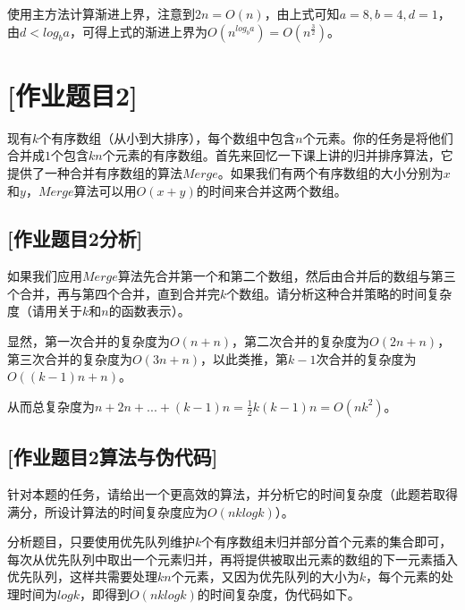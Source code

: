 \documentclass{article}
\begin{document}
使用主方法计算渐进上界，注意到$2n=O(n)$，由上式可知$a=8,b=4,d=1$，由$d<log_b a$，可得上式的渐进上界为$O(n^{log_b a})=O(n^\frac{3}{2})$。


\section{[作业题目2]} %


现有$k$个有序数组（从小到大排序），每个数组中包含$n$个元素。你的任务是将他们合并成$1$个包含$kn$个元素的有序数组。首先来回忆一下课上讲的归并排序算法，它提供了一种合并有序数组的算法$Merge$。如果我们有两个有序数组的大小分别为$x$和$y$，$Merge$算法可以用$O(x+y)$的时间来合并这两个数组。

\subsection{[作业题目2分析]} %

如果我们应用$Merge$算法先合并第一个和第二个数组，然后由合并后的数组与第三个合并，再与第四个合并，直到合并完$k$个数组。请分析这种合并策略的时间复杂度（请用关于$k$和$n$的函数表示）。

显然，第一次合并的复杂度为$O(n+n)$，第二次合并的复杂度为$O(2n+n)$，第三次合并的复杂度为$O(3n+n)$，以此类推，第$k-1$次合并的复杂度为$O((k-1)n+n)$。

从而总复杂度为$n+2n+...+(k-1)n=\frac{1}{2}k(k-1)n=O(nk^2)$。

\subsection{[作业题目2算法与伪代码]} %

针对本题的任务，请给出一个更高效的算法，并分析它的时间复杂度（此题若取得满分，所设计算法的时间复杂度应为$O(n k log k)$）。

分析题目，只要使用优先队列维护$k$个有序数组未归并部分首个元素的集合即可，每次从优先队列中取出一个元素归并，再将提供被取出元素的数组的下一元素插入优先队列，这样共需要处理$k n$个元素，又因为优先队列的大小为$k$，每个元素的处理时间为$log k$，即得到$O(n k log k)$的时间复杂度，伪代码如下。

\end{document}
